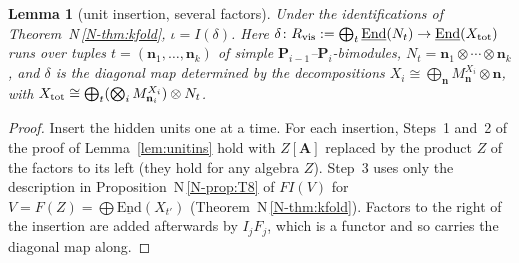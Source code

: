 \documentclass[11pt]{article}
\newtheorem{lemma}[theorem]{Lemma}
\theoremstyle{definition}
\theoremstyle{remark}
\newcommand{\bfA}{\mathbf A}
\newcommand{\nref}[1]{N\,\ref{N-#1}}
\begin{document}
\begin{lemma}[unit insertion, several factors]\label{lem:unitins2}
Under the identifications of Theorem~\nref{thm:kfold}, $\iota=I(\delta)$. Here $\delta\colon R_{\rm vis}:=\bigoplus_t\underline{\mathrm{End}}(N_t)\to\underline{\mathrm{End}}(X_{\rm tot})$ runs over tuples $t=(\mathbf n_1,\dots,\mathbf n_k)$ of simple $\mathbf P_{i-1}$--$\mathbf P_i$-bimodules, $N_t=\mathbf n_1\otimes\cdots\otimes\mathbf n_k$, and $\delta$ is the diagonal map determined by the decompositions $X_i\cong\bigoplus_{\mathbf n}M^{X_i}_{\mathbf n}\otimes\mathbf n$, with $X_{\rm tot}\cong\bigoplus_t(\bigotimes_iM^{X_i}_{\mathbf n_i})\otimes N_t$.
\end{lemma}
\begin{proof}
Insert the hidden units one at a time. For each insertion, Steps~1 and~2 of the proof of Lemma~\ref{lem:unitins} hold with $Z[\bfA]$ replaced by the product $Z$ of the factors to its left (they hold for any algebra $Z$). Step~3 uses only the description in Proposition~\nref{prop:T8} of $F I(V)$ for $V=F(Z)=\bigoplus\underline{\mathrm{End}}(X_{t'})$ (Theorem~\nref{thm:kfold}). Factors to the right of the insertion are added afterwards by $I_jF_j$, which is a functor and so carries the diagonal map along.
\end{proof}
\end{document}
